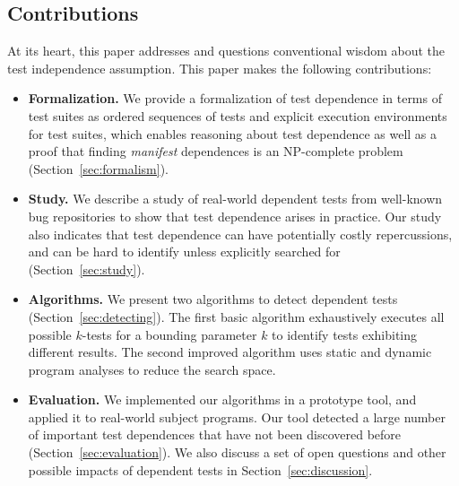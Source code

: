 \subsection{Contributions}

At its heart, this paper addresses and questions
conventional wisdom about the test independence assumption. 
This paper makes the following contributions:

\begin{itemize}
\item \textbf{Formalization.} We provide a formalization of test dependence
  in terms of test suites as ordered sequences of tests and explicit execution
  environments for test suites, which enables reasoning about test dependence
  as well as a proof that finding \emph{manifest} dependences is an NP-complete
  problem (Section~\ref{sec:formalism}).

  \item \textbf{Study.} We describe a study of  real-world
  dependent tests from well-known bug repositories to show that test dependence
  arises in practice. Our study also indicates that test dependence can have
  potentially costly repercussions, and can be hard to identify unless
  explicitly searched for (Section~\ref{sec:study}).

  \item \textbf{Algorithms.} We present two algorithms
  to detect dependent tests (Section~\ref{sec:detecting}). The first
  basic algorithm exhaustively executes all possible $k$-tests for
  a bounding parameter $k$ to identify tests exhibiting different results.
  The second improved algorithm uses static and dynamic program analyses
  to reduce the search space. 

  \item \textbf{Evaluation.} We implemented our algorithms in a prototype
  tool, and applied it to  real-world subject programs. Our
  tool detected a large number of important test dependences that have not
  been discovered before (Section~\ref{sec:evaluation}).
  We also discuss a set of open questions and other possible impacts of dependent
  tests in Section~\ref{sec:discussion}.
\end{itemize}


